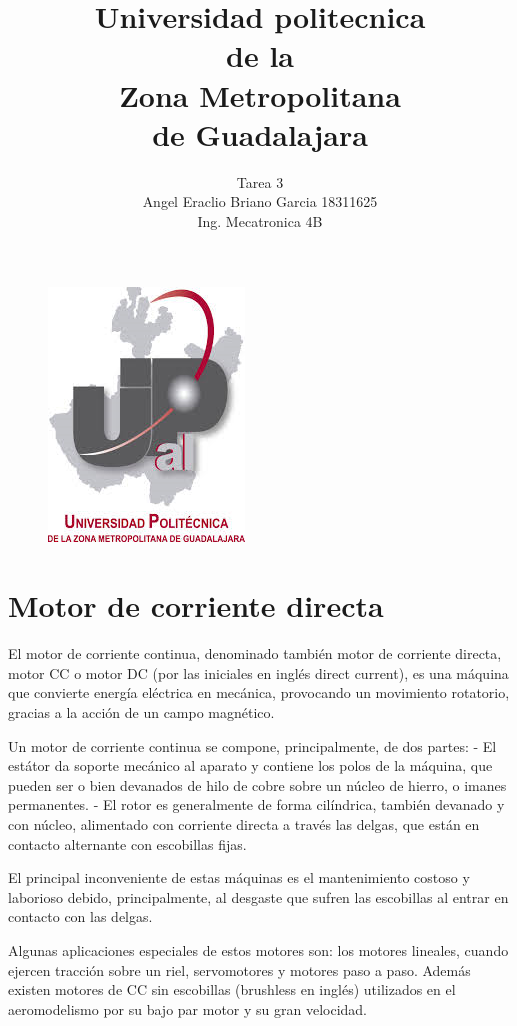 \documentclass[12pt,a4paper]{article}
\begin{document}
\title{Universidad politecnica\\ de la \\ Zona Metropolitana\\ de Guadalajara}
\author{Tarea 3\\ Angel Eraclio Briano Garcia 18311625\\ Ing. Mecatronica 4B}
\maketitle
\begin{figure}[h!]
\centering
\includegraphics[scale=1]{untitled.png} 
\end{figure}
\newpage
\section{Motor de corriente directa}
El motor de corriente continua, denominado también motor de corriente directa, motor CC o motor DC (por las iniciales en inglés direct current), es una máquina que convierte energía eléctrica en mecánica, provocando un movimiento rotatorio, gracias a la acción de un campo magnético.

Un motor de corriente continua se compone, principalmente, de dos partes: - El estátor da soporte mecánico al aparato y contiene los polos de la máquina, que pueden ser o bien devanados de hilo de cobre sobre un núcleo de hierro, o imanes permanentes. - El rotor es generalmente de forma cilíndrica, también devanado y con núcleo, alimentado con corriente directa a través las delgas, que están en contacto alternante con escobillas fijas.

El principal inconveniente de estas máquinas es el mantenimiento costoso y laborioso debido, principalmente, al desgaste que sufren las escobillas al entrar en contacto con las delgas.

Algunas aplicaciones especiales de estos motores son: los motores lineales, cuando ejercen tracción sobre un riel, servomotores y motores paso a paso. Además existen motores de CC sin escobillas (brushless en inglés) utilizados en el aeromodelismo por su bajo par motor y su gran velocidad.
\end{document}
